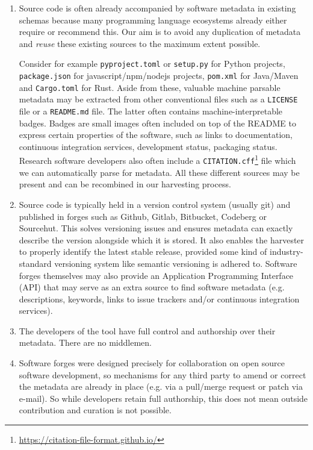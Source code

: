 \documentclass[a4paper,11pt]{article}
\begin{document}
\begin{enumerate}

\item
Source code is often already accompanied by software metadata in existing
schemas because many programming language ecosystems already either require or
recommend this. Our aim is to avoid any duplication of metadata and
\emph{reuse} these existing sources to the maximum extent possible.

Consider
for example \texttt{pyproject.toml} or \texttt{setup.py} for Python projects,
\texttt{package.json} for javascript/npm/nodejs projects, \texttt{pom.xml} for
Java/Maven and \texttt{Cargo.toml} for Rust. Aside from these, valuable machine
parsable metadata may be extracted from other conventional files such as a \texttt{LICENSE}
file or a \texttt{README.md} file. The latter often contains machine-interpretable
badges. Badges are small images often included on top of the README to express certain properties of the software, such as links to
documentation, continuous integration services, development status, packaging
status. Research software developers also often include a \texttt{CITATION.cff}\footnote{\url{https://citation-file-format.github.io/}} file which we can automatically parse for metadata. All these different
sources may be present and can be recombined in our harvesting process.

\item 
  Source code 
  is typically held in a version control system (usually git) and published in 
  forges such as Github, Gitlab, Bitbucket, Codeberg or Sourcehut.
  This solves versioning issues and ensures metadata can exactly describe the version alongside which it is stored. It also enables the 
  harvester to properly identify the latest stable release, provided some kind of industry-standard versioning system like semantic versioning is adhered to.
  Software forges themselves may also provide an Application Programming Interface (API) that may serve as an extra source to find software metadata (e.g. descriptions, keywords, links to issue trackers and/or continuous integration services).
\item 
  The developers of the tool have full control and authorship over their metadata. There are no middlemen.
\item 
  Software forges were designed precisely for collaboration on open source software development, so mechanisms for any
  third party to amend or correct the metadata are already in place (e.g. via a pull/merge request or patch via e-mail).
  So while developers retain full authorship, this does not mean outside contribution and curation is not possible.
\end{enumerate}
\end{document}
